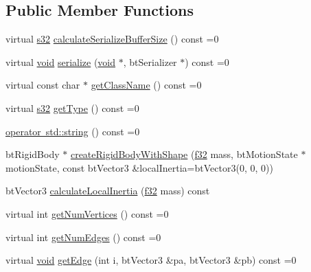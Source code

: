 \subsection*{Public Member Functions}
\begin{DoxyCompactItemize}
\item 
virtual \mbox{\hyperlink{_util_8h_aa62c75d314a0d1f37f79c4b73b2292e2}{s32}} \mbox{\hyperlink{classnjli_1_1_physics_shape_a0612a1c8c3f4520d78cb7f5838f03074}{calculate\+Serialize\+Buffer\+Size}} () const =0
\item 
virtual \mbox{\hyperlink{_thread_8h_af1e856da2e658414cb2456cb6f7ebc66}{void}} \mbox{\hyperlink{classnjli_1_1_physics_shape_a2ac8a109a5ad67ee79f40ce8f28337cf}{serialize}} (\mbox{\hyperlink{_thread_8h_af1e856da2e658414cb2456cb6f7ebc66}{void}} $\ast$, bt\+Serializer $\ast$) const =0
\item 
virtual const char $\ast$ \mbox{\hyperlink{classnjli_1_1_physics_shape_a72cb98a55614a3e264b8e4a157b45c64}{get\+Class\+Name}} () const =0
\item 
virtual \mbox{\hyperlink{_util_8h_aa62c75d314a0d1f37f79c4b73b2292e2}{s32}} \mbox{\hyperlink{classnjli_1_1_physics_shape_ac7c6b2ac373892095f8220d56f8ad6de}{get\+Type}} () const =0
\item 
\mbox{\hyperlink{classnjli_1_1_physics_shape_a890d915f88af06dcf1ac1fa4f5943dc2}{operator std\+::string}} () const =0
\item 
bt\+Rigid\+Body $\ast$ \mbox{\hyperlink{classnjli_1_1_physics_shape_ab71ebdd73aea0c6ce0a47c9c47284a66}{create\+Rigid\+Body\+With\+Shape}} (\mbox{\hyperlink{_util_8h_a5f6906312a689f27d70e9d086649d3fd}{f32}} mass, bt\+Motion\+State $\ast$motion\+State, const bt\+Vector3 \&local\+Inertia=bt\+Vector3(0, 0, 0))
\item 
bt\+Vector3 \mbox{\hyperlink{classnjli_1_1_physics_shape_a7195c6413beb2e8bc4916e97ffca02f2}{calculate\+Local\+Inertia}} (\mbox{\hyperlink{_util_8h_a5f6906312a689f27d70e9d086649d3fd}{f32}} mass) const
\item 
virtual int \mbox{\hyperlink{classnjli_1_1_physics_shape_ac3f7cc28341fd58ace164bf8666480f0}{get\+Num\+Vertices}} () const =0
\item 
virtual int \mbox{\hyperlink{classnjli_1_1_physics_shape_a24df999ba2b7ac0d9abda09c4f17c2fe}{get\+Num\+Edges}} () const =0
\item 
virtual \mbox{\hyperlink{_thread_8h_af1e856da2e658414cb2456cb6f7ebc66}{void}} \mbox{\hyperlink{classnjli_1_1_physics_shape_a657e98309a2a171ccb02a054a04c9b57}{get\+Edge}} (int i, bt\+Vector3 \&pa, bt\+Vector3 \&pb) const =0

\end{DoxyCompactItemize}
